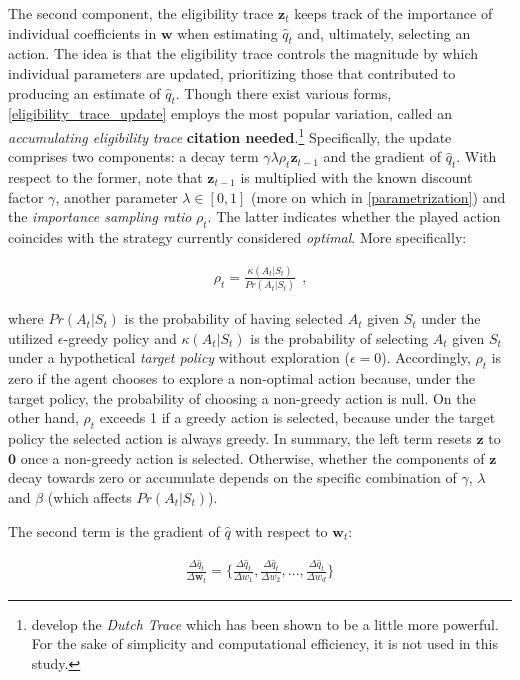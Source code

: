 The second component, the eligibility trace $\boldsymbol{z}_t$ keeps track of the importance of individual coefficients in $\boldsymbol{w}$ when estimating $\hat{q}_t$ and, ultimately, selecting an action. The idea is that the eligibility trace controls the magnitude by which individual parameters are updated, prioritizing those that contributed to producing an estimate of $\hat{q}_t$. Though there exist various forms, \autoref{eligibility_trace_update} employs the most popular variation, called an \emph{accumulating eligibility trace} \textbf{citation needed}.\footnote{\textcite{seijen_true_2014} develop the \emph{Dutch Trace} which has been shown to be a little more powerful. For the sake of simplicity and computational efficiency, it is not used in this study.} Specifically, the update comprises two components: a decay term $\gamma \lambda \rho_t \boldsymbol{z}_{t-1}$ and the gradient of $\hat{q}_t$. With respect to the former, note that $\boldsymbol{z}_{t-1}$ is multiplied with the known discount factor $\gamma$, another parameter $\lambda \in [0,1]$ (more on which in \autoref{parametrization}) and the \emph{importance sampling ratio} $\rho_t$. The latter indicates whether the played action coincides with the strategy currently considered \emph{optimal}. More specifically:

\begin{gather}
	 \rho_t = \frac{\kappa(A_t|S_{t})}{Pr(A_t|S_t)} ~~  \text{,}
\end{gather}

where $Pr(A_t|S_t)$ is the probability of having selected $A_t$ given $S_t$ under the utilized $\epsilon$-greedy policy and $\kappa(A_t|S_t)$ is the probability of selecting $A_t$ given $S_t$ under a hypothetical \emph{target policy} without exploration ($\epsilon = 0$). Accordingly, $\rho_t$ is zero if the agent chooses to explore a non-optimal action because, under the target policy, the probability of choosing a non-greedy action is null. On the other hand, $\rho_t$ exceeds 1 if a greedy action is selected, because under the target policy the selected action is always greedy. In summary, the left term resets $\boldsymbol{z}$ to $\boldsymbol{0}$ once a non-greedy action is selected. Otherwise, whether the components of $\boldsymbol{z}$ decay towards zero or accumulate depends on the specific combination of $\gamma$, $\lambda$ and $\beta$ (which affects $Pr(A_t|S_t)$).

The second term is the gradient of $\hat{q}$ with respect to $\boldsymbol{w}_t$:

\begin{gather}\label{gradient}
	\frac{\Delta \hat{q}_t}{\Delta \boldsymbol{w}_t} =
	\{ \frac{\Delta \hat{q}_t}{\Delta w_1},
	\frac{\Delta \hat{q}_t}{\Delta w_2},
	...,
	\frac{\Delta \hat{q}_t}{\Delta w_d}  \}
\end{gather}

